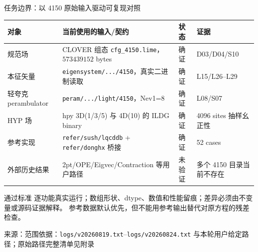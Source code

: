 \documentclass[UTF8,aspectratio=169,11pt]{ctexbeamer}
\newcommand{\source}[1]{\vspace{0.05em}\par{\raggedright\scriptsize\color{muted}来源：#1\par}}
\newcommand{\verified}{\textcolor{evidence}{确证}}
\newcommand{\unverified}{\textcolor{warning}{未验证}}
\begin{document}
\begin{frame}[t]{任务边界：以 4150 原始输入驱动可复现对照}
  \footnotesize
  \setlength{\tabcolsep}{2pt}
  \renewcommand{\arraystretch}{0.92}
  \begin{tabularx}{0.96\textwidth}{@{}L Y l Y@{}}
    \toprule
    对象 & 当前使用的输入/契约 & 状态 & 证据\\
    \midrule
    规范场 & CLOVER 组态 \texttt{cfg\_4150.lime}，$573439152$ bytes & \verified & D03/D04/S10\\
    本征矢量 & \texttt{eigensystem/.../4150}，真实二进制读取 & \verified & L15/L26--L29\\
    轻夸克 perambulator & \texttt{peram/.../light/4150}，Nev1=8 & \verified & L08/S07\\
    HYP 场 & hpy 3D(1/3/5) 与 4D(10) 的 ILDG binary & \verified & 4096 sites 抽样幺正性\\
    参考实现 & \texttt{refer/sush/lqcddb} + \texttt{refer/donghx} 桥接 & \verified & 52 cases\\
    外部历史结果 & 2pt/OPE/Eigvec/Contraction 等用户路径 & \unverified & 多个 4150 目录当前不存在\\
    \bottomrule
  \end{tabularx}
  \begin{block}{通过标准}
    逐功能真实运行；数组形状、dtype、数值和性能留痕；差异必须由不变量或源码证据解释。
    参考数据默认优先，但不能用参考输出替代对原方程的残差检查。
  \end{block}
  \source{范围依据：\texttt{logs/v20260819.txt}--\texttt{logs/v20260824.txt} 与本轮用户给定路径；原始路径完整清单见附录}
\end{frame}
\end{document}
